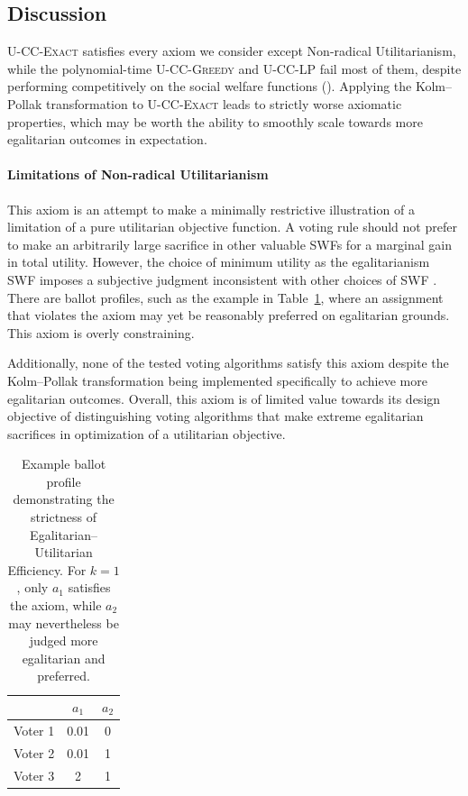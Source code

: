 \documentclass[letterpaper]{article} %
\newcommand{\Exact}{\textsc{U-CC-Exact}}
\newcommand{\Greedy}{\textsc{U-CC-Greedy}}
\newcommand{\LP}{\textsc{U-CC-LP}}
\begin{document}
\subsection{Discussion}
\label{app:axiom-discussion}

\Exact{} satisfies every axiom we consider except Non-radical Utilitarianism, while the polynomial-time \Greedy{} and \LP{} fail most of them, despite performing competitively on the social welfare functions ().
Applying the Kolm--Pollak transformation to \Exact{} leads to strictly worse axiomatic properties, which may be worth the ability to smoothly scale towards more egalitarian outcomes in expectation.

\paragraph{Limitations of Non-radical Utilitarianism}
This axiom is an attempt to make a minimally restrictive illustration of a limitation of a pure utilitarian objective function.
A voting rule should not prefer to make an arbitrarily large sacrifice in other valuable SWFs for a marginal gain in total utility.
However, the choice of minimum utility as the egalitarianism SWF imposes a subjective judgment inconsistent with other choices of SWF \citep{atkinson-1970}.
There are ballot profiles, such as the example in Table~\ref{tab:egal-util-strict}, where an assignment that violates the axiom may yet be reasonably preferred on egalitarian grounds.
This axiom is overly constraining.

Additionally, none of the tested voting algorithms satisfy this axiom despite the Kolm--Pollak transformation being implemented specifically to achieve more egalitarian outcomes.
Overall, this axiom is of limited value towards its design objective of distinguishing voting algorithms that make extreme egalitarian sacrifices in optimization of a utilitarian objective.

\begin{table}[t]
\centering
\begin{tabular}{l|cc}
\hline
 & $a_1$ & $a_2$ \\
\hline
Voter 1 & 0.01 & 0 \\
Voter 2 & 0.01 & 1 \\
Voter 3 & 2 & 1 \\
\hline
\end{tabular}
\caption{Example ballot profile demonstrating the strictness of Egalitarian--Utilitarian Efficiency.
For \(k=1\), only \(a_1\) satisfies the axiom, while \(a_2\) may nevertheless be judged more egalitarian and preferred.}
\label{tab:egal-util-strict}
\end{table}
\end{document}
